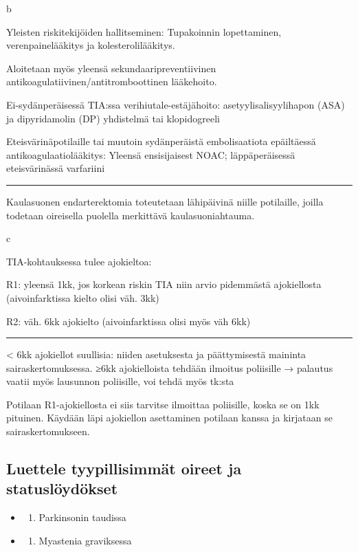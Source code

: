\documentclass[
]{book}
\providecommand{\tightlist}{%
  \setlength{\itemsep}{0pt}\setlength{\parskip}{0pt}}
\begin{document}
b

Yleisten riskitekijöiden hallitseminen: Tupakoinnin lopettaminen, verenpainelääkitys ja kolesterolilääkitys.

Aloitetaan myös yleensä sekundaaripreventiivinen antikoagulatiivinen/antitromboottinen lääkehoito.

Ei-sydänperäisessä TIA:ssa verihiutale-estäjähoito: asetyylisalisyylihapon (ASA) ja dipyridamolin (DP) yhdistelmä tai klopidogreeli

Eteisvärinäpotilaille tai muutoin sydänperäistä embolisaatiota epäiltäessä antikoagulaatiolääkitys: Yleensä ensisijaisest NOAC; läppäperäisessä eteisvärinässä varfariini

\begin{center}\rule{0.5\linewidth}{0.5pt}\end{center}

Kaulasuonen endarterektomia toteutetaan lähipäivinä niille potilaille, joilla todetaan oireisella puolella merkittävä kaulasuoniahtauma.

c

TIA-kohtauksessa tulee ajokieltoa:

R1: yleensä 1kk, jos korkean riskin TIA niin arvio pidemmästä ajokiellosta (aivoinfarktissa kielto olisi väh. 3kk)

R2: väh. 6kk ajokielto (aivoinfarktissa olisi myös väh 6kk)

\begin{center}\rule{0.5\linewidth}{0.5pt}\end{center}

\textless{} 6kk ajokiellot suullisia: niiden asetuksesta ja päättymisestä maininta sairaskertomuksessa. ≥6kk ajokielloista tehdään ilmoitus poliisille → palautus vaatii myös lausunnon poliisille, voi tehdä myös tk:sta

Potilaan R1-ajokiellosta ei siis tarvitse ilmoittaa poliisille, koska se on 1kk pituinen. Käydään läpi ajokiellon asettaminen potilaan kanssa ja kirjataan se sairaskertomukseen.

\subsection{Luettele tyypillisimmät oireet ja statuslöydökset}\label{luettele-tyypillisimmuxe4t-oireet-ja-statusluxf6yduxf6kset}

\begin{itemize}
\tightlist
\item
  \begin{enumerate}
  \def\labelenumi{\alph{enumi}.}
  \tightlist
  \item
    Parkinsonin taudissa
  \end{enumerate}
\item
  \begin{enumerate}
  \def\labelenumi{\alph{enumi}.}
  \setcounter{enumi}{1}
  \tightlist
  \item
    Myastenia graviksessa
  \end{enumerate}
\end{itemize}
\end{document}
